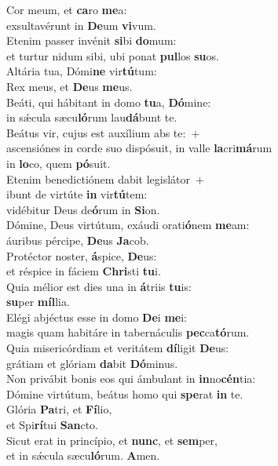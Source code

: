 \evenverse Cor meum, et \textbf{ca}ro \textbf{me}a:~\*\\
\evenverse exsultavérunt in \textbf{De}um \textbf{vi}vum.\\
\oddverse Etenim passer invénit \textbf{si}bi \textbf{do}mum:~\*\\
\oddverse et turtur nidum sibi, ubi ponat \textbf{pul}los \textbf{su}os.\\
\evenverse Altária tua, Dómi\textbf{ne} vir\textbf{tú}tum:~\*\\
\evenverse Rex meus, et \textbf{De}us \textbf{me}us.\\
\oddverse Beáti, qui hábitant in domo \textbf{tu}a, \textbf{Dó}mine:~\*\\
\oddverse in sǽcula sæcu\textbf{ló}rum lau\textbf{dá}bunt te.\\
\evenverse Beátus vir, cujus est auxílium abs te:~+\\
\evenverse  ascensiónes in corde suo dispósuit, in valle \textbf{la}cri\textbf{má}rum~\*\\
\evenverse in \textbf{lo}co, quem \textbf{pó}suit.\\
\oddverse Etenim benedictiónem dabit legislátor~+\\
\oddverse  ibunt de virtúte \textbf{in} vir\textbf{tú}tem:~\*\\
\oddverse vidébitur Deus de\textbf{ó}rum in \textbf{Si}on.\\
\evenverse Dómine, Deus virtútum, exáudi orati\textbf{ó}nem \textbf{me}am:~\*\\
\evenverse áuribus pércipe, \textbf{De}us \textbf{Ja}cob.\\
\oddverse Protéctor noster, \textbf{á}spice, \textbf{De}us:~\*\\
\oddverse et réspice in fáciem \textbf{Chri}sti \textbf{tu}i.\\
\evenverse Quia mélior est dies una in \textbf{á}triis \textbf{tu}is:~\*\\
\evenverse \textbf{su}per \textbf{míl}lia.\\
\oddverse Elégi abjéctus esse in domo \textbf{De}i \textbf{me}i:~\*\\
\oddverse magis quam habitáre in tabernáculis \textbf{pec}ca\textbf{tó}rum.\\
\evenverse Quia misericórdiam et veritátem \textbf{dí}ligit \textbf{De}us:~\*\\
\evenverse grátiam et glóriam \textbf{da}bit \textbf{Dó}minus.\\
\oddverse Non privábit bonis eos qui ámbulant in \textbf{in}no\textbf{cén}tia:~\*\\
\oddverse Dómine virtútum, beátus homo qui \textbf{spe}rat \textbf{in} te.\\
\evenverse Glória \textbf{Pa}tri, et \textbf{Fí}lio,~\*\\
\evenverse et Spi\textbf{rí}tui \textbf{San}cto.\\
\oddverse Sicut erat in princípio, et \textbf{nunc}, et \textbf{sem}per,~\*\\
\oddverse et in sǽcula sæcu\textbf{ló}rum. \textbf{A}men.\\
